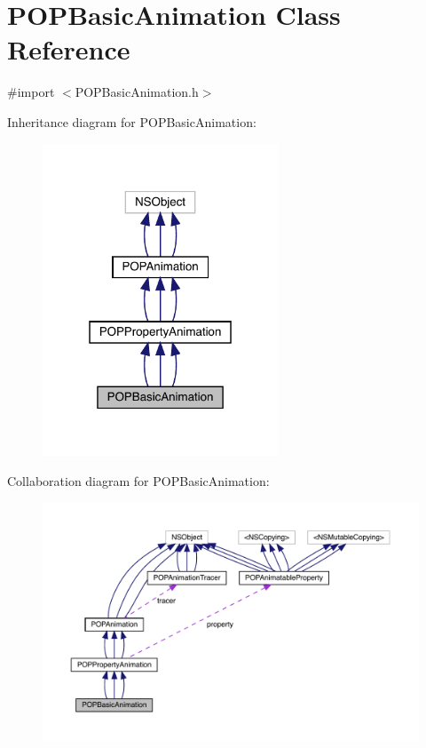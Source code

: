 \hypertarget{interface_p_o_p_basic_animation}{}\section{P\+O\+P\+Basic\+Animation Class Reference}
\label{interface_p_o_p_basic_animation}


{\ttfamily \#import $<$P\+O\+P\+Basic\+Animation.\+h$>$}



Inheritance diagram for P\+O\+P\+Basic\+Animation\+:\nopagebreak
\begin{figure}[H]
\begin{center}
\leavevmode
\includegraphics[width=199pt]{interface_p_o_p_basic_animation__inherit__graph}
\end{center}
\end{figure}


Collaboration diagram for P\+O\+P\+Basic\+Animation\+:\nopagebreak
\begin{figure}[H]
\begin{center}
\leavevmode
\includegraphics[width=350pt]{interface_p_o_p_basic_animation__coll__graph}
\end{center}
\end{figure}
